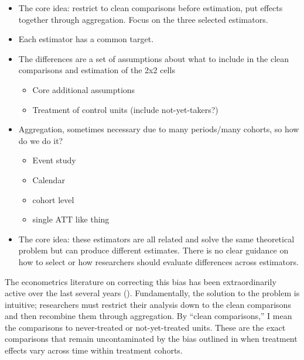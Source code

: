 \documentclass[12pt]{article}
\begin{document}
\begin{itemize}
    \item The core idea: restrict to clean comparisons before estimation, put effects together through aggregation. Focus on the three selected estimators.
    \item Each estimator has a common target.
    \item The differences are a set of assumptions about what to include in the clean comparisons and estimation of the 2x2 cells
    \begin{itemize}
        \item Core additional assumptions
        \item Treatment of control units (include not-yet-takers?)
    \end{itemize}
    \item Aggregation, sometimes necessary due to many periods/many cohorts, so how do we do it?
    \begin{itemize}
        \item Event study
        \item Calendar
        \item cohort level
        \item single ATT like thing
    \end{itemize}
    \item The core idea: these estimators are all related and solve the same theoretical problem but can produce different estimates. There is no clear guidance on how to select or how researchers should evaluate differences across estimators.
\end{itemize}

The econometrics literature on correcting this bias has been extraordinarily active over the last several years (\cite{callaway2021difference, sun2021estimating, borusyak2024revisiting, gardner2022two, goodman2021difference,baker2022much, baker2026difference}). Fundamentally, the solution to the problem is intuitive; researchers must restrict their analysis down to the clean comparisons and then recombine them through aggregation. By ``clean comparisons,'' I mean the comparisons to never-treated or not-yet-treated units. These are the exact comparisons that remain uncontaminated by the bias outlined in \cite{goodman2021difference} when treatment effects vary across time within treatment cohorts. 
\end{document}

